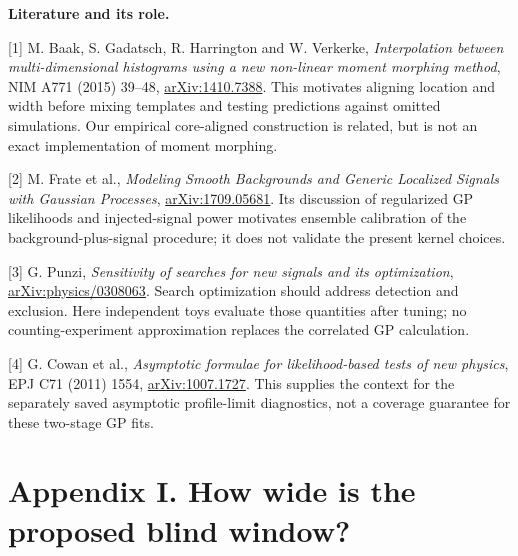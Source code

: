 \documentclass[11pt]{article}
\begin{document}
\textbf{Literature and its role.}

[1] M. Baak, S. Gadatsch, R. Harrington and W. Verkerke, \emph{Interpolation between multi-dimensional histograms using a new non-linear moment morphing method}, NIM A771 (2015) 39--48, \href{https://arxiv.org/abs/1410.7388}{arXiv:1410.7388}. This motivates aligning location and width before mixing templates and testing predictions against omitted simulations. Our empirical core-aligned construction is related, but is not an exact implementation of moment morphing.

[2] M. Frate et al., \emph{Modeling Smooth Backgrounds and Generic Localized Signals with Gaussian Processes}, \href{https://arxiv.org/abs/1709.05681}{arXiv:1709.05681}. Its discussion of regularized GP likelihoods and injected-signal power motivates ensemble calibration of the background-plus-signal procedure; it does not validate the present kernel choices.

[3] G. Punzi, \emph{Sensitivity of searches for new signals and its optimization}, \href{https://arxiv.org/abs/physics/0308063}{arXiv:physics/0308063}. Search optimization should address detection and exclusion. Here independent toys evaluate those quantities after tuning; no counting-experiment approximation replaces the correlated GP calculation.

[4] G. Cowan et al., \emph{Asymptotic formulae for likelihood-based tests of new physics}, EPJ C71 (2011) 1554, \href{https://arxiv.org/abs/1007.1727}{arXiv:1007.1727}. This supplies the context for the separately saved asymptotic profile-limit diagnostics, not a coverage guarantee for these two-stage GP fits.
\clearpage\section*{Appendix I. How wide is the proposed blind window?}
\end{document}
